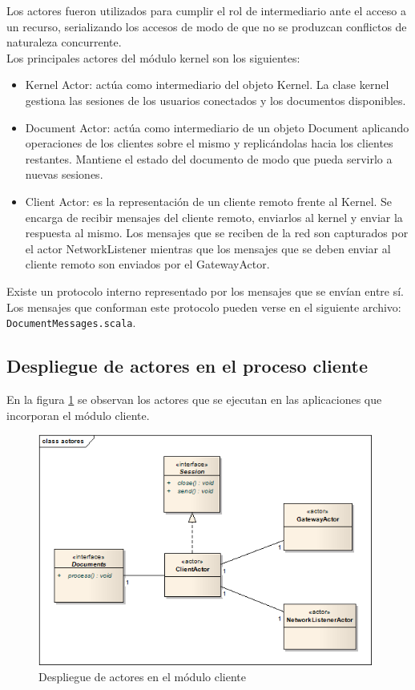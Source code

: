 \documentclass[12pt,a4paper]{article}
\begin{document}
Los actores fueron utilizados para cumplir el rol de intermediario ante el acceso a un recurso, serializando los accesos de
modo de que no se produzcan conflictos de naturaleza concurrente. \\

Los principales actores del módulo kernel son los siguientes:
\begin{itemize}
	\item Kernel Actor: actúa como intermediario del objeto Kernel. La clase kernel gestiona las sesiones de los usuarios
	conectados y los documentos disponibles.
	\item Document Actor: actúa como intermediario de un objeto Document aplicando operaciones de los clientes sobre el mismo
	y replicándolas hacia los clientes restantes. Mantiene el estado del documento de modo que pueda servirlo a nuevas sesiones.
	\item Client Actor: es la representación de un cliente remoto frente al Kernel. Se encarga de recibir mensajes del
	cliente remoto, enviarlos al kernel y enviar la respuesta al mismo. Los mensajes que se reciben de la red son capturados por
	el actor NetworkListener mientras que los mensajes que se deben enviar al cliente remoto son enviados por el GatewayActor.
\end{itemize}

Existe un protocolo interno representado por los mensajes que se envían entre sí. Los mensajes que conforman este protocolo
pueden verse en el siguiente archivo: \texttt{DocumentMessages.scala}.

\subsection{Despliegue de actores en el proceso cliente}
En la figura \ref{actores-cliente} se observan los actores que se ejecutan en las aplicaciones que incorporan el módulo cliente.

	\begin{figure}[!ht]
		\begin{center}
			\includegraphics[width=11cm]{actores-cliente.png}
			\caption{\label{actores-cliente} Despliegue de actores en el módulo cliente }
		\end{center}
	\end{figure}
\end{document}
